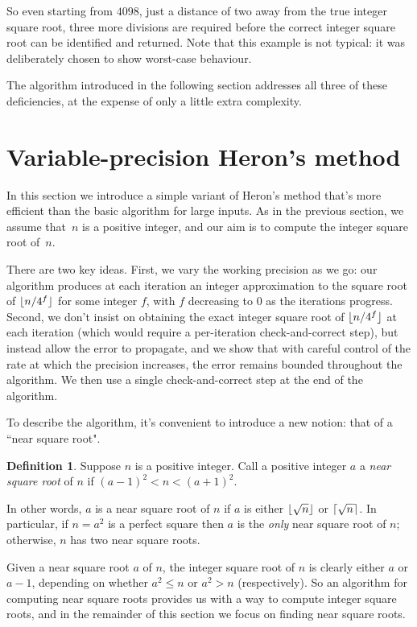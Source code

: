 \documentclass[a4paper]{article}
\DeclarePairedDelimiter\floor{\lfloor}{\rfloor}
\DeclarePairedDelimiter\ceil{\lceil}{\rceil}
\theoremstyle{plain}
\theoremstyle{definition}
\newtheorem{definition}[theorem]{Definition}
\begin{document}
So even starting from $4098$, just a distance of two away from the true integer
square root, three more divisions are required before the correct integer
square root can be identified and returned. Note that this example is not
typical: it was deliberately chosen to show worst-case behaviour.

The algorithm introduced in the following section addresses all three of these
deficiencies, at the expense of only a little extra complexity.

\section{Variable-precision Heron's method}
\label{new_method}

In this section we introduce a simple variant of Heron's method that's
more efficient than the basic algorithm for large inputs. As in
the previous section, we assume that~$n$ is a positive integer, and our aim
is to compute the integer square root of~$n$.

There are two key ideas. First, we vary the working precision as we go: our
algorithm produces at each iteration an integer approximation to the square
root of $\floor{n/4^f}$ for some integer $f$, with $f$ decreasing to $0$ as the
iterations progress. Second, we don't insist on obtaining the exact integer
square root of $\floor{n/4^f}$ at each iteration (which would require a
per-iteration check-and-correct step), but instead allow the error to
propagate, and we show that with careful control of the rate at which the
precision increases, the error remains bounded throughout the algorithm. We
then use a single check-and-correct step at the end of the algorithm.

To describe the algorithm, it's convenient to introduce a new notion: that of a
``near square root".

\begin{definition}
  Suppose $n$ is a positive integer. Call a positive integer $a$ a
  \emph{near square root} of $n$ if $(a - 1)^2 < n < (a + 1)^2$.
\end{definition}

In other words, $a$ is a near square root of $n$ if $a$ is either $\floor{\sqrt
n}$ or $\ceil{\sqrt n}$. In particular, if $n = a^2$ is a perfect square then
$a$ is the \emph{only} near square root of $n$; otherwise, $n$ has two near
square roots.

Given a near square root $a$ of $n$, the integer square root of $n$ is clearly
either $a$ or $a-1$, depending on whether $a^2 \le n$ or $a^2 > n$
(respectively). So an algorithm for computing near square roots provides us
with a way to compute integer square roots, and in the remainder of this
section we focus on finding near square roots.
\end{document}

